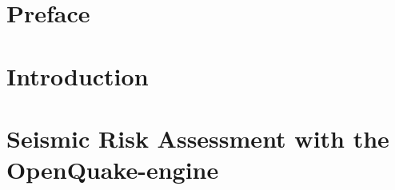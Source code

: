 \documentclass[11pt,fleqn]{book} %
\begin{document}








\pagestyle{empty} %
\tableofcontents %
\cleardoublepage %
\pagestyle{fancy} %

\chapter*{Preface}



\chapter{Introduction}
   \label{chap:introduction}
	
   \cleardoublepage

\chapter{Seismic Risk Assessment with the OpenQuake-engine}
   \label{chap:oq-risk}
	
   \cleardoublepage
\end{document}
